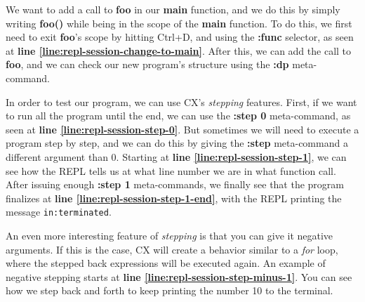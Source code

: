 \documentclass[11pt,fleqn,openany]{book} %
\begin{document}
We want to add a call to \textbf{foo} in our \textbf{main} function, and we do this by simply writing \textbf{foo()} while being in the scope of the \textbf{main} function. To do this, we first need to exit \textbf{foo}'s scope by hitting Ctrl+D, and using the \textbf{:func} selector, as seen at \textbf{line \ref{line:repl-session-change-to-main}}. After this, we can add the call to \textbf{foo}, and we can check our new program's structure using the \textbf{:dp} meta-command.

In order to test our program, we can use CX's \emph{stepping} features. First, if we want to run all the program until the end, we can use the \textbf{:step 0} meta-command, as seen at \textbf{line \ref{line:repl-session-step-0}}. But sometimes we will need to execute a program step by step, and we can do this by giving the \textbf{:step} meta-command a different argument than 0. Starting at \textbf{line \ref{line:repl-session-step-1}}, we can see how the REPL tells us at what line number we are in what function call. After issuing enough \textbf{:step 1} meta-commands, we finally see that the program finalizes at \textbf{line \ref{line:repl-session-step-1-end}}, with the REPL printing the message \lstinline{in:terminated}.

An even more interesting feature of \emph{stepping} is that you can give it negative arguments. If this is the case, CX will create a behavior similar to a \emph{for} loop, where the stepped back expressions will be executed again. An example of negative stepping starts at \textbf{line \ref{line:repl-session-step-minus-1}}. You can see how we step back and forth to keep printing the number 10 to the terminal.

\end{document}
